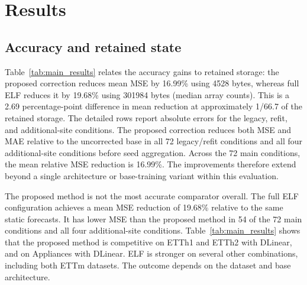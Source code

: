 \section{Results}
\label{sec:results}

\subsection{Accuracy and retained state}
Table~\ref{tab:main_results} relates the accuracy gains to retained storage: the proposed correction reduces mean MSE by 16.99\% using 4528 bytes, whereas full ELF reduces it by 19.68\% using 301984 bytes (median array counts). This is a 2.69 percentage-point difference in mean reduction at approximately 1/66.7 of the retained storage. The detailed rows report absolute errors for the legacy, refit, and additional-site conditions. The proposed correction reduces both MSE and MAE relative to the uncorrected base in all 72 legacy/refit conditions and all four additional-site conditions before seed aggregation. Across the 72 main conditions, the mean relative MSE reduction is 16.99\%. The improvements therefore extend beyond a single architecture or base-training variant within this evaluation.

\begin{table}[!t]
\caption{Accuracy--storage tradeoff and absolute forecast errors. The overview uses all 72 legacy/refit conditions: storage is the median retained array size, and MSE reduction is the mean condition-wise reduction relative to Static. Lower absolute errors are preferred. Panels A and B average losses over three seeds within each dataset--backbone condition. Panel C uses seed 0. Bold indicates the minimum among Static, ELF, and Proposed for each metric before rounding to four decimal places. ELF denotes the full transferred Fourier regressor with the global controller.}
\label{tab:main_results}
\centering

\end{table}

The proposed method is not the most accurate comparator overall. The full ELF configuration achieves a mean MSE reduction of 19.68\% relative to the same static forecasts. It has lower MSE than the proposed method in 54 of the 72 main conditions and all four additional-site conditions. Table~\ref{tab:main_results} shows that the proposed method is competitive on ETTh1 and ETTh2 with DLinear, and on Appliances with DLinear. ELF is stronger on several other combinations, including both ETTm datasets. The outcome depends on the dataset and base architecture.


